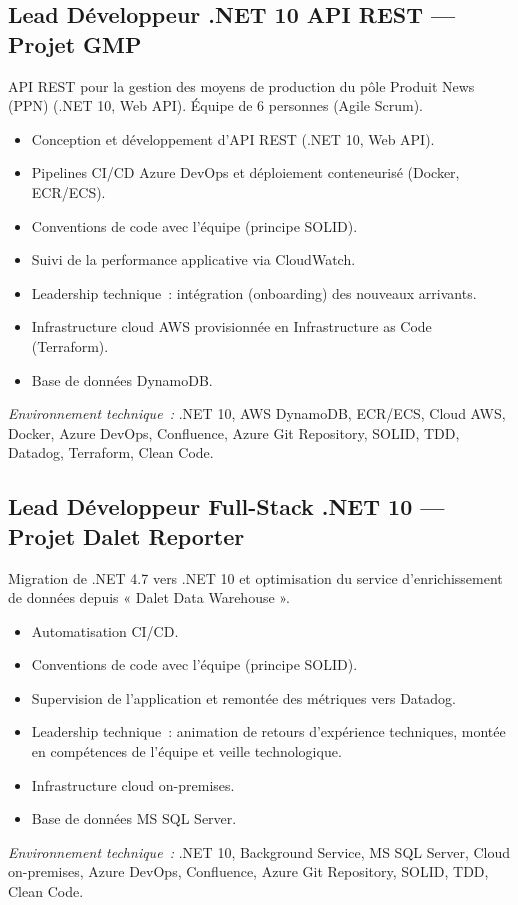 \documentclass[10pt,a4paper]{article}
\begin{document}
\vspace{6pt}

\subsection*{Lead Développeur .NET 10 API REST --- Projet GMP}
\color{darkgray}
API REST pour la gestion des moyens de production du pôle Produit News (PPN) (.NET 10, Web API). Équipe de 6 personnes (Agile Scrum).
\begin{itemize}
  \item Conception et développement d'API REST (.NET 10, Web API).
  \item Pipelines CI/CD Azure DevOps et déploiement conteneurisé (Docker, ECR/ECS).
  \item Conventions de code avec l'équipe (principe SOLID).
  \item Suivi de la performance applicative via CloudWatch.
  \item Leadership technique~: intégration (onboarding) des nouveaux arrivants.
  \item Infrastructure cloud AWS provisionnée en Infrastructure as Code (Terraform).
  \item Base de données DynamoDB.
\end{itemize}
\textit{Environnement technique~:} .NET 10, AWS DynamoDB, ECR/ECS, Cloud AWS, Docker, Azure DevOps, Confluence, Azure Git Repository, SOLID, TDD, Datadog, Terraform, Clean Code.

\vspace{6pt}

\subsection*{Lead Développeur Full-Stack .NET 10 --- Projet Dalet Reporter}
\color{darkgray}
Migration de .NET 4.7 vers .NET 10 et optimisation du service d'enrichissement de données depuis « Dalet Data Warehouse ».
\begin{itemize}
  \item Automatisation CI/CD.
  \item Conventions de code avec l'équipe (principe SOLID).
  \item Supervision de l'application et remontée des métriques vers Datadog.
  \item Leadership technique~: animation de retours d'expérience techniques, montée en compétences de l'équipe et veille technologique.
  \item Infrastructure cloud on-premises.
  \item Base de données MS SQL Server.
\end{itemize}
\textit{Environnement technique~:} .NET 10, Background Service, MS SQL Server, Cloud on-premises, Azure DevOps, Confluence, Azure Git Repository, SOLID, TDD, Clean Code.
\end{document}
